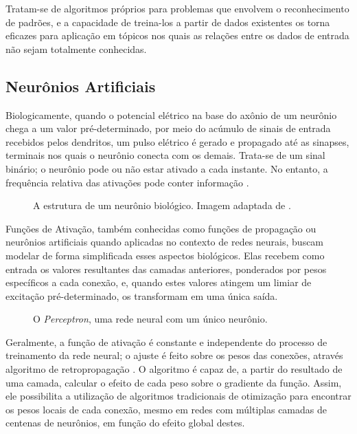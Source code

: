 Tratam-se de algoritmos próprios para problemas que envolvem o reconhecimento de padrões, e a capacidade de treina-los a partir de dados existentes os torna eficazes para aplicação em tópicos nos quais as relações entre os dados de entrada não sejam totalmente conhecidas.

\subsection{Neurônios Artificiais}

Biologicamente, quando o potencial elétrico na base do axônio de um neurônio chega a um valor pré-determinado, por meio do acúmulo de sinais de entrada recebidos pelos dendritos, um pulso elétrico é gerado e propagado até as sinapses, terminais nos quais o neurônio conecta com os demais.
Trata-se de um sinal binário; o neurônio pode ou não estar ativado a cada instante. No entanto, a frequência relativa das ativações pode conter informação \cite{behnkeHierarchicalNeuralNetworks2003}.

\begin{figure}[H]
    \centering
    
    \caption{A estrutura de um neurônio biológico. Imagem adaptada de \cite{dhp1080IdoSkemoPri2016}.}
    \label{fig:bio_neuron}
\end{figure}

Funções de Ativação, também conhecidas como funções de propagação ou neurônios artificiais quando aplicadas no contexto de redes neurais, buscam modelar de forma simplificada esses aspectos biológicos.
Elas recebem como entrada os valores resultantes das camadas anteriores, ponderados por pesos específicos a cada conexão, e, quando estes valores atingem um limiar de excitação pré-determinado, os transformam em uma única saída.

\begin{figure}[H]
    \centering
    
    \caption{O \textit{Perceptron}, uma rede neural com um único neurônio.}
    \label{fig:perceptron}
\end{figure}

Geralmente, a função de ativação é constante e independente do processo de treinamento da rede neural; o ajuste é feito sobre os pesos das conexões, através algoritmo de retropropagação \cite{dreyfusArtificialNeuralNetworks1990}.
O algoritmo é capaz de, a partir do resultado de uma camada, calcular o efeito de cada peso sobre o gradiente da função.
Assim, ele possibilita a utilização de algoritmos tradicionais de otimização para encontrar os pesos locais de cada conexão, mesmo em redes com múltiplas camadas de centenas de neurônios, em função do efeito global destes.

